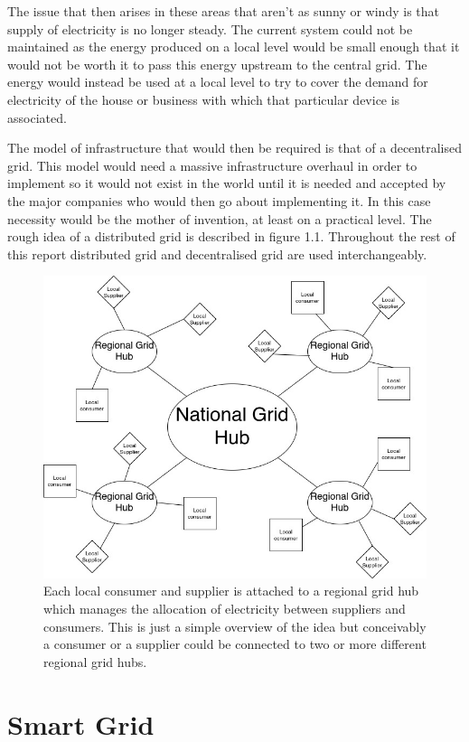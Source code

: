 \documentclass[a4paper, notitlepage]{report}
\begin{document}
The issue that then arises in these areas that aren't as sunny or windy is that
supply of electricity is no longer steady. The current system could not be
maintained as the energy produced on a local level would be small enough that it
would not be worth it to pass this energy upstream to the central grid. The
energy would instead be used at a local level to try to cover the demand for
electricity of the house or business with which that particular device is
associated.

The model of infrastructure that would then be required is that of a
decentralised grid. This model would need a massive infrastructure overhaul in
order to implement so it would not exist in the world until it is needed and
accepted by the major companies who would then go about implementing it. In this
case necessity would be the mother of invention, at least on a practical level.
The rough idea of a distributed grid is described in figure 1.1. Throughout the
rest of this report distributed grid and decentralised grid are used
interchangeably. 

\begin{figure}[htbp]
\centering
\includegraphics[width=.9\linewidth]{./img/DecentralisedGrid.jpg}
\caption{\label{fig:org4987f36}
Each local consumer and supplier is attached to a regional grid hub which manages the allocation of electricity between suppliers and consumers. This is just a simple overview of the idea but conceivably a consumer or a supplier could be connected to two or more different regional grid hubs.}
\end{figure}
\chapter{Smart Grid}
\label{sec:org4326a75}
\end{document}
